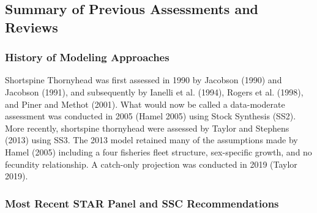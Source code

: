 \documentclass[11pt,
  english,
  letterpaper,
]{article}
\begin{document}
\hypertarget{summary-of-previous-assessments-and-reviews}{%
\subsection{Summary of Previous Assessments and Reviews}\label{summary-of-previous-assessments-and-reviews}}

\hypertarget{history-of-modeling-approaches}{%
\subsubsection{History of Modeling Approaches}\label{history-of-modeling-approaches}}

Shortspine Thornyhead was first assessed in 1990 by Jacobson (1990) and Jacobson (1991), and subsequently by Ianelli et al. (1994), Rogers et al. (1998), and Piner and Methot (2001). What would now be called a data-moderate assessment was conducted in 2005 (Hamel 2005) using Stock Synthesis (SS2). More recently, shortspine thornyhead were assessed by Taylor and Stephens (2013) using SS3. The 2013 model retained many of the assumptions made by Hamel (2005) including a four fisheries fleet structure, sex-specific growth, and no fecundity relationship. A catch-only projection was conducted in 2019 (Taylor 2019).

\hypertarget{most-recent-star-panel-and-ssc-recommendations}{%
\subsubsection{Most Recent STAR Panel and SSC Recommendations}\label{most-recent-star-panel-and-ssc-recommendations}}
\end{document}
